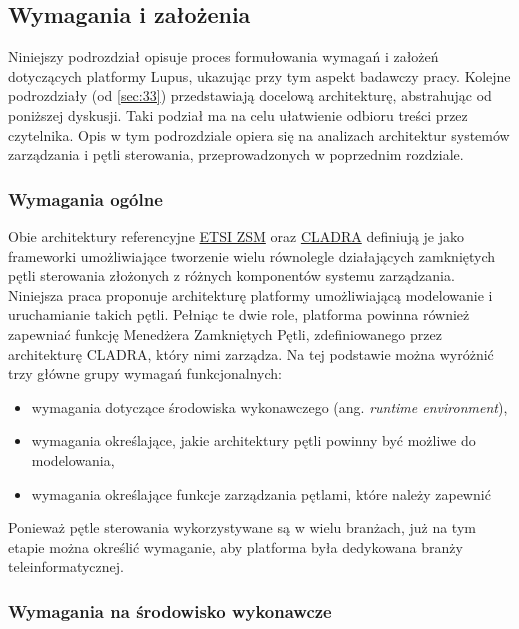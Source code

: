 \subsection{Wymagania i założenia}\label{sec:32}


Niniejszy podrozdział opisuje proces formułowania wymagań i założeń dotyczących platformy Lupus, ukazując przy tym aspekt badawczy pracy. Kolejne podrozdziały (od \ref{sec:33}) przedstawiają docelową architekturę, abstrahując od poniższej dyskusji. Taki podział ma na celu ułatwienie odbioru treści przez czytelnika. Opis w tym podrozdziale opiera się na analizach architektur systemów zarządzania i pętli sterowania, przeprowadzonych w poprzednim rozdziale.

\subsubsection{Wymagania ogólne}

Obie architektury referencyjne \hyperlink{sec:zsm}{ETSI ZSM} oraz \hyperlink{sec:cladra}{CLADRA} definiują je jako frameworki umożliwiające tworzenie wielu równolegle działających zamkniętych pętli sterowania złożonych z różnych komponentów systemu zarządzania. Niniejsza praca proponuje architekturę platformy umożliwiającą modelowanie i uruchamianie takich pętli. Pełniąc te dwie role, platforma powinna również zapewniać funkcję Menedżera Zamkniętych Pętli, zdefiniowanego przez architekturę CLADRA, który nimi zarządza. Na tej podstawie można wyróżnić trzy główne grupy wymagań funkcjonalnych:
\begin{itemize}
    \item wymagania dotyczące środowiska wykonawczego (ang. \textit{runtime environment}), 
    \item wymagania określające, jakie architektury pętli powinny być możliwe do modelowania,
    \item wymagania określające funkcje zarządzania pętlami, które należy zapewnić
\end{itemize}

Ponieważ pętle sterowania wykorzystywane są w wielu branżach, już na tym etapie można określić wymaganie, aby platforma była dedykowana branży teleinformatycznej.

\subsubsection{Wymagania na środowisko wykonawcze}

